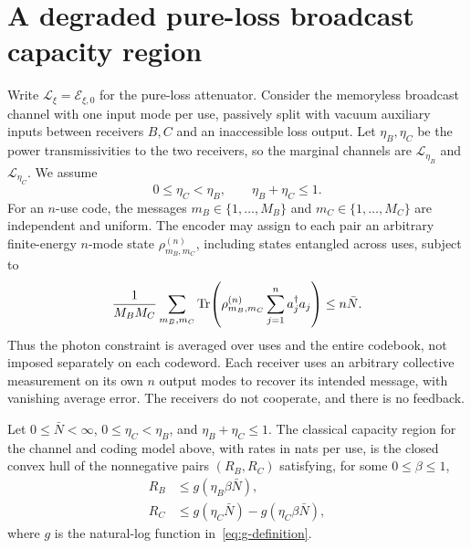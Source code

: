 \section{A degraded pure-loss broadcast capacity region}\label{sec:broadcast}

Write \(\mathcal L_\xi=\mathcal E_{\xi,0}\) for the pure-loss attenuator.
Consider the memoryless broadcast channel with one input mode per use,
passively split with vacuum auxiliary inputs between receivers \(B,C\)
and an inaccessible loss output. Let \(\eta_B,\eta_C\) be the power
transmissivities to the two receivers, so the marginal channels are
\(\mathcal L_{\eta_B}\) and \(\mathcal L_{\eta_C}\). We assume
\[
 0\le\eta_C<\eta_B,\qquad \eta_B+\eta_C\le1.
\]
For an \(n\)-use code, the messages \(m_B\in\{1,\ldots,M_B\}\) and
\(m_C\in\{1,\ldots,M_C\}\) are independent and uniform. The encoder
may assign to each pair an arbitrary finite-energy \(n\)-mode state
\(\rho_{m_B,m_C}^{(n)}\), including states entangled across uses, subject to
\begin{equation}\label{eq:broadcast-energy}
 \frac1{M_BM_C}\sum_{m_B,m_C}
 \operatorname{Tr}\!\left(\rho_{m_B,m_C}^{(n)}
             \sum_{j=1}^n a_j^\dagger a_j\right)
 \le n\bar N.
\end{equation}
Thus the photon constraint is averaged over uses and the entire
codebook, not imposed separately on each codeword. Each receiver uses
an arbitrary collective measurement on its own \(n\) output modes to
recover its intended message, with vanishing average error. The
receivers do not cooperate, and there is no feedback.

\begin{corollary}
\label{cor:broadcast-capacity}
Let \(0\le\bar N<\infty\), \(0\le\eta_C<\eta_B\), and
\(\eta_B+\eta_C\le1\). The classical capacity region for the channel
and coding model above, with rates in nats per use, is the closed
convex hull of the nonnegative pairs \((R_B,R_C)\) satisfying, for
some \(0\le\beta\le1\),
\begin{equation}\label{eq:broadcast-region}
\begin{aligned}
 R_B&\le g(\eta_B\beta\bar N),\\
 R_C&\le g(\eta_C\bar N)-g(\eta_C\beta\bar N),
\end{aligned}
\end{equation}
where \(g\) is the natural-log function in~\eqref{eq:g-definition}.
\end{corollary}

